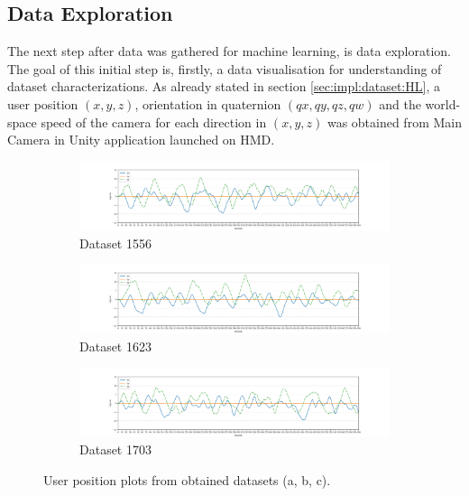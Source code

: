 \subsection{Data Exploration}
\label{sec:impl:dataset:explor} 
The next step after data was gathered for machine learning, is data exploration. The goal of this initial step is, firstly, a data visualisation for understanding of dataset characterizations. As already stated in section \ref{sec:impl:dataset:HL}, a user position $(x, y, z)$, orientation in quaternion $(qx, qy, qz, qw)$ and the world-space speed of the camera for each direction in $(x, y, z)$ was obtained from Main Camera in Unity application launched on HMD.

\begin{figure}[H]
	\centering
	\begin{subfigure}[b]{1\textwidth}
		\centering
		\includegraphics[width=1\textwidth, keepaspectratio]{gfx/Fig-1556-position.pdf}
		\caption{Dataset 1556}
		\label{fig:pos1}
	\end{subfigure}
	\qquad
	\begin{subfigure}[b]{1\textwidth}
		\centering
		\includegraphics[width=\textwidth]{gfx/Fig-1613-position.pdf}
		\caption{Dataset 1623}
		\label{fig:pos2}
	\end{subfigure}
	\qquad
	\begin{subfigure}[b]{1\textwidth}
		\centering
		\includegraphics[width=1\textwidth, keepaspectratio]{gfx/Fig-1703-position.pdf}
		\caption{Dataset 1703}
		\label{fig:pos3}
	\end{subfigure}
	\caption{User position plots from obtained datasets (a, b, c).}
	\label{fig:datasets}
\end{figure}
